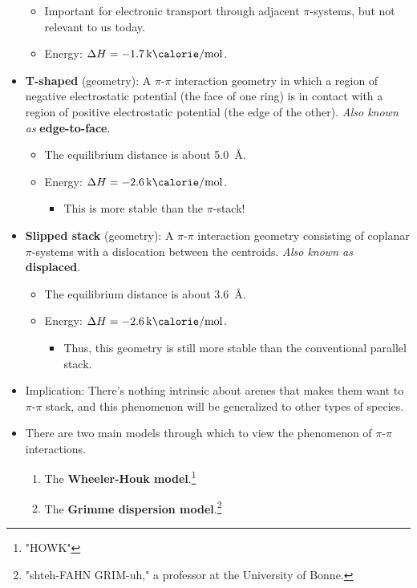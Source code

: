\documentclass[../notes.tex]{subfiles}
\begin{document}
\begin{itemize}
\begin{itemize}
        \item Important for electronic transport through adjacent $\pi$-systems, but not relevant to us today.
        \item Energy: $\Delta H=-\kcal{1.7}$.
    \end{itemize}
    \item \textbf{T-shaped} (geometry): A $\pi$-$\pi$ interaction geometry in which a region of negative electrostatic potential (the face of one ring) is in contact with a region of positive electrostatic potential (the edge of the other). \emph{Also known as} \textbf{edge-to-face}.
    \begin{itemize}
        \item The equilibrium distance is about \SI{5.0}{\angstrom}.
        \item Energy: $\Delta H=-\kcal{2.6}$.
        \begin{itemize}
            \item This is more stable than the $\pi$-stack!
        \end{itemize}
    \end{itemize}
    \item \textbf{Slipped stack} (geometry): A $\pi$-$\pi$ interaction geometry consisting of coplanar $\pi$-systems with a dislocation between the centroids. \emph{Also known as} \textbf{displaced}.
    \begin{itemize}
        \item The equilibrium distance is about \SI{3.6}{\angstrom}.
        \item Energy: $\Delta H=-\kcal{2.6}$.
        \begin{itemize}
            \item Thus, this geometry is still more stable than the conventional parallel stack.
        \end{itemize}
    \end{itemize}
    \item Implication: There's nothing intrinsic about arenes that makes them want to $\pi$-$\pi$ stack, and this phenomenon will be generalized to other types of species.
    \item There are two main models through which to view the phenomenon of $\pi$-$\pi$ interactions.
    \begin{enumerate}
        \item The \textbf{Wheeler-Houk model}.\footnote{"HOWK"}
        \item The \textbf{Grimme dispersion model}.\footnote{"shteh-FAHN GRIM-uh," a professor at the University of Bonne.}

\end{enumerate}
\end{itemize}
\end{document}
